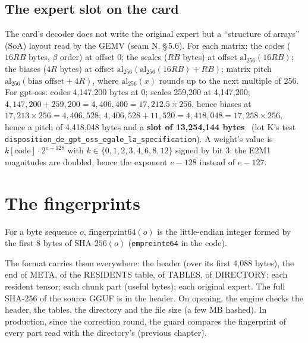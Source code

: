 \subsection{The expert slot on the card}\label{t2fmt:sec:emplacement}

The card's decoder does not write the original expert but a ``structure of arrays'' (SoA) layout read by the GEMV (seam N,  §\,5.6). For each matrix: the codes ($16RB$ bytes, $\beta$ order) at offset 0; the scales ($RB$ bytes) at offset $\mathrm{al}_{256}(16RB)$; the biases ($4R$ bytes) at offset $\mathrm{al}_{256}(\mathrm{al}_{256}(16RB) + RB)$; matrix pitch $\mathrm{al}_{256}(\text{bias offset} + 4R)$, where $\mathrm{al}_{256}(x)$ rounds up to the next multiple of 256. For gpt-oss: codes 4{,}147{,}200 bytes at 0; scales 259{,}200 at 4{,}147{,}200; $4{,}147{,}200 + 259{,}200 = 4{,}406{,}400 = 17{,}212.5 \times 256$, hence biases at $17{,}213 \times 256 = 4{,}406{,}528$; $4{,}406{,}528 + 11{,}520 = 4{,}418{,}048 = 17{,}258 \times 256$, hence a pitch of 4{,}418{,}048 bytes and a \textbf{slot of 13{,}254{,}144 bytes} \calc~(lot K's test \nolinkurl{disposition_de_gpt_oss_egale_la_specification}). A weight's value is $k[\text{code}] \cdot 2^{e - 128}$ with $k \in \{0, 1, 2, 3, 4, 6, 8, 12\}$ signed by bit 3: the E2M1 magnitudes are doubled, hence the exponent $e - 128$ instead of $e - 127$.

\section{The fingerprints}\label{t2fmt:sec:empreintes}

\begin{definition}[Fingerprint64]
For a byte sequence $o$, $\mathrm{fingerprint64}(o)$ is the little-endian integer formed by the first 8 bytes of $\mathrm{SHA\text{-}256}(o)$ \cite{fips180_4} (\texttt{empreinte64} in the code).
\end{definition}

The format carries them everywhere: the header (over its first 4{,}088 bytes), the end of META, of the RESIDENTS table, of TABLES, of DIRECTORY; each resident tensor; each chunk part (useful bytes); each original expert. The full SHA-256 of the source GGUF is in the header. On opening, the engine checks the header, the tables, the directory and the file size (a few MB hashed). In production, since the correction round, the guard compares the fingerprint of every part read with the directory's (previous chapter).

